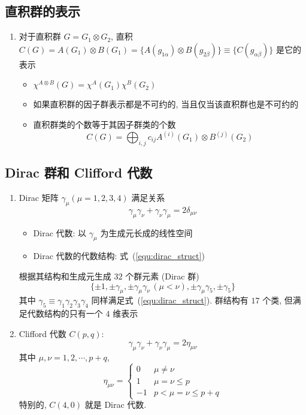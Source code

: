 \documentclass[12pt,a4paper]{article}%
\numberwithin{equation}{section}%
\begin{document}
\subsection{直积群的表示} %
\label{sub:direct_product_reps}
\begin{enumerate}
	\item 对于直积群 $G = G_1\otimes G_2$, 直积 $C(G) = A(G_1)\otimes B(G_1) = \{A(g_{1\alpha})\otimes B(g_{2\beta})\}\equiv \{C(g_{\alpha\beta})\}$ 是它的表示
	\begin{itemize}
		\item $\chi^{A\otimes B}(G) = \chi^A(G_1)\chi^B(G_2)$
		\item 如果直积群的因子群表示都是不可约的, 当且仅当该直积群也是不可约的
		\item 直积群类的个数等于其因子群类的个数
		\begin{equation}
			C(G) = \bigoplus_{i,j} c_{ij}A^{(i)}(G_1)\otimes B^{(j)}(G_2)
		\end{equation}
	\end{itemize}
\end{enumerate}
\subsection{Dirac 群和 Clifford 代数} %
\label{sub:dirac_group_and_clifford_alg}
\begin{enumerate}
	\item Dirac 矩阵 $\gamma_\mu (\mu = 1,2,3,4)$ 满足关系
	\begin{equation}\label{equ:dirac_struct}
		\gamma_\mu\gamma_\nu + \gamma_\nu\gamma_\mu =  2\delta_{\mu\nu}
	\end{equation}
	\begin{itemize}
		\item Dirac 代数: 以 $\gamma_\mu$ 为生成元长成的线性空间
		\item Dirac 代数的代数结构: 式~(\ref{equ:dirac_struct})
	\end{itemize}
	根据其结构和生成元生成 $32$ 个群元素 (Dirac 群)
	\begin{equation}
		\{\pm 1, \pm\gamma_\mu, \pm\gamma_\mu\gamma_\nu\,(\mu<\nu), \pm\gamma_\mu\gamma_5, \pm\gamma_5\}
	\end{equation}
	其中 $\gamma_5 \equiv \gamma_1\gamma_2\gamma_3\gamma_4$ 同样满足式~(\ref{equ:dirac_struct}). 群结构有 $17$ 个类, 但满足代数结构的只有一个 $4$ 维表示
	\item Clifford 代数 $C(p,q)$: 
	\begin{equation}
		\gamma_\mu\gamma_\nu + \gamma_\nu\gamma_\mu = 2\eta_{\mu\nu}
	\end{equation}
	其中 $\mu,\nu = 1,2,\cdots,p+q$, 
	\begin{equation}
		\eta_{\mu\nu} = \begin{cases}
			0 & \mu\neq\nu \\
			1 & \mu=\nu\le p \\
			-1 & p<\mu=\nu\le p+q
		\end{cases}
	\end{equation}
	特别的, $C(4,0)$ 就是 Dirac 代数. %
\end{enumerate}
\end{document}
